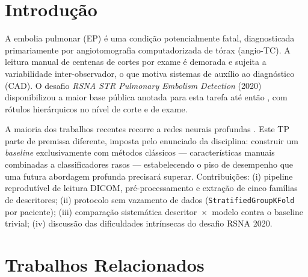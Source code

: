 \documentclass[12pt,a4paper]{article}
\begin{document}

\section{Introdução}

A embolia pulmonar (EP) é uma condição potencialmente fatal, diagnosticada
primariamente por angiotomografia computadorizada de tórax (angio-TC). A leitura
manual de centenas de cortes por exame é demorada e sujeita a variabilidade
inter-observador, o que motiva sistemas de auxílio ao diagnóstico (CAD). O desafio
\emph{RSNA STR Pulmonary Embolism Detection} (2020) disponibilizou a maior base
pública anotada para esta tarefa até então \cite{colak2021rsnadataset}, com rótulos
hierárquicos no nível de corte e de exame.

A maioria dos trabalhos recentes recorre a redes neurais profundas
\cite{huang2020penet}. Este TP parte de premissa diferente, imposta pelo enunciado
da disciplina: construir um \emph{baseline} exclusivamente com métodos clássicos
--- características manuais combinadas a classificadores rasos --- estabelecendo o
piso de desempenho que uma futura abordagem profunda precisará superar.
Contribuições: (i) pipeline reprodutível de leitura DICOM, pré-processamento e
extração de cinco famílias de descritores; (ii) protocolo sem vazamento de dados
(\texttt{StratifiedGroupKFold} por paciente); (iii) comparação sistemática
descritor~$\times$~modelo contra o baseline trivial; (iv) discussão das
dificuldades intrínsecas do desafio RSNA 2020.

\section{Trabalhos Relacionados}
\end{document}
